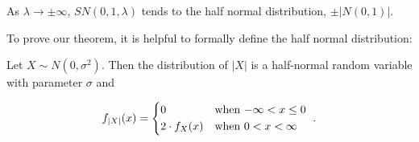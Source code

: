 \documentclass{article}
\begin{document}
\begin{property} \label{prop:3}
  As $\lambda \to \pm \infty$, \thinspace $SN(0,1,\lambda)$ tends to the half normal distribution, $\pm |N(0,1)|$.
\end{property}

To prove our theorem, it is helpful to formally define the half normal distribution:

\begin{helper-lem} \label{lem:p2-half-normal}
  Let $X \sim N(0, \sigma^2)$. Then the distribution of $|X|$ is a half-normal
  random variable with parameter $\sigma$ and

  \begin{equation*}
    f_{|X|}(x) =
    \begin{dcases*}
      0              & when $-\infty < x \leq 0$ \\
      2 \cdot f_X(x) & when $0 < x < \infty$ 
    \end{dcases*}
    .
  \end{equation*}
\end{helper-lem}
\end{document}
